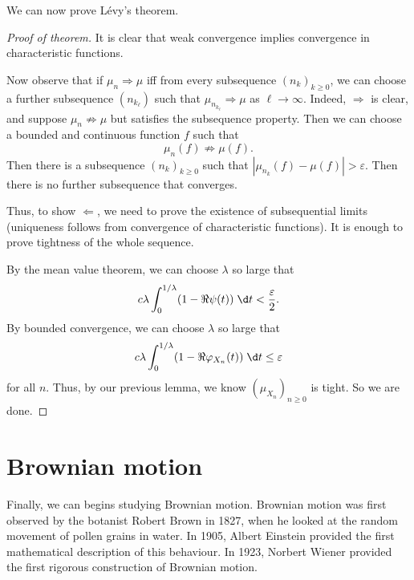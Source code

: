 \documentclass[a4paper]{article}
\begin{document}
We can now prove L\'evy's theorem.
\begin{proof}[Proof of theorem]
  It is clear that weak convergence implies convergence in characteristic functions.

  Now observe that if $\mu_n \Rightarrow \mu$ iff from every subsequence $(n_k)_{k \geq 0}$, we can choose a further subsequence $(n_{k_\ell})$ such that $\mu_{n_{k_{\ell}}} \Rightarrow \mu$ as $\ell \to \infty$. Indeed, $\Rightarrow$ is clear, and suppose $\mu_n \not \Rightarrow \mu$ but satisfies the subsequence property. Then we can choose a bounded and continuous function $f$ such that
  \[
    \mu_n(f) \not \Rightarrow \mu(f).
  \]
  Then there is a subsequence $(n_k)_{k \geq 0}$ such that $|\mu_{n_k}(f) - \mu(f)| > \varepsilon$. Then there is no further subsequence that converges.

  Thus, to show $\Leftarrow$, we need to prove the existence of subsequential limits (uniqueness follows from convergence of characteristic functions). It is enough to prove tightness of the whole sequence.

  By the mean value theorem, we can choose $\lambda$ so large that
  \[
    c \lambda \int_0^{1/\lambda} (1 - \Re \psi(t)) \;\d t < \frac{\varepsilon}{2}.
  \]
  By bounded convergence, we can choose $\lambda$ so large that
  \[
    c \lambda \int_0^{1/\lambda} (1 - \Re \varphi_{X_n}(t))\;\d t \leq \varepsilon
  \]
  for all $n$. Thus, by our previous lemma, we know $(\mu_{X_n})_{n \geq 0}$ is tight. So we are done.
\end{proof}

\section{Brownian motion}
Finally, we can begins studying Brownian motion. Brownian motion was first observed by the botanist Robert Brown in 1827, when he looked at the random movement of pollen grains in water. In 1905, Albert Einstein provided the first mathematical description of this behaviour. In 1923, Norbert Wiener provided the first rigorous construction of Brownian motion.
\end{document}
